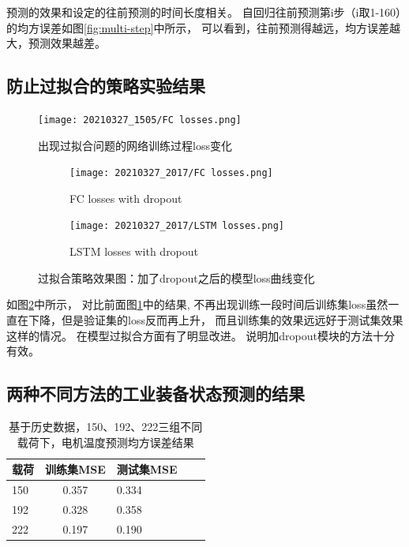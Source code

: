   预测的效果和设定的往前预测的时间长度相关。
  自回归往前预测第i步（i取1-160）的均方误差如图\ref{fig:multi-step}中所示，
  可以看到，往前预测得越远，均方误差越大，预测效果越差。
\subsection{防止过拟合的策略实验结果}

  \begin{figure}
    \centering
    \texttt{[image: 20210327\_1505/FC losses.png]}
    \caption{出现过拟合问题的网络训练过程loss变化}
    \label{fig:overfit FC 1}
  \end{figure}

  \begin{figure}
    \centering
    \begin{subfigure}[b]{0.45\textwidth}
      \centering
      \texttt{[image: 20210327\_2017/FC losses.png]}
      \caption{FC losses with dropout}
      \label{fig:FC losses with dropout}
    \end{subfigure}
    \hfill
    \begin{subfigure}[b]{0.45\textwidth}
        \centering
        \texttt{[image: 20210327\_2017/LSTM losses.png]}
        \caption{LSTM losses with dropout}
        \label{fig:LSTM losses with dropout}
    \end{subfigure}
       \caption{过拟合策略效果图：加了dropout之后的模型loss曲线变化}
       \label{fig:losses with dropout}
  \end{figure}

  如图\ref{fig:FC losses with dropout}中所示，
  对比前面图\ref{fig:overfit FC 1}中的结果,
  不再出现训练一段时间后训练集loss虽然一直在下降，但是验证集的loss反而再上升，
  而且训练集的效果远远好于测试集效果这样的情况。
  在模型过拟合方面有了明显改进。
  说明加dropout模块的方法十分有效。

\subsection{两种不同方法的工业装备状态预测的结果}
  
  \begin{table}
    \centering
    \caption{基于历史数据，150、192、222三组不同载荷下，电机温度预测均方误差结果}
    \begin{tabular}{lclcl}
      \toprule
      载荷       & 训练集MSE & 测试集MSE                                   \\
      \midrule
      150    & 0.357 & 0.334                                \\
      192 & 0.328 & 0.358                                     \\
      222 & 0.197 & 0.190                  \\
      \bottomrule
    \end{tabular}
    \label{tab:regression motor results}
  \end{table}

